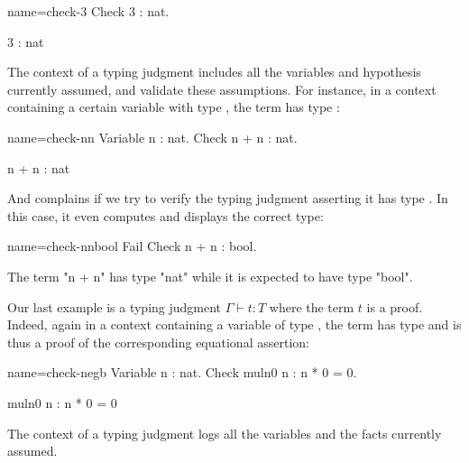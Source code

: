\begin{coq-left}{name=check-3}{}
Check 3 : nat.
\end{coq-left}
\begin{coqout-right}
3 : nat
\end{coqout-right}

The context of a typing judgment includes all the variables and
hypothesis currently assumed, and validate these assumptions.
For instance, in a context containing a certain variable  with
type , the term  has type :

\begin{coq-left}{name=check-nn}{}
Variable n : nat.
Check n + n : nat.
\end{coq-left}
\begin{coqout-right}
n + n : nat
\end{coqout-right}

And \Coq{} complains if we try to verify the typing judgment asserting it
has type . In this case, it even computes and displays the
correct type:

\begin{coq-left}{name=check-nnbool}{}
Fail Check n + n : bool.

\end{coq-left}
\begin{coqout-right}
The term "n + n" has type "nat" while it is expected to have type "bool".
\end{coqout-right}

Our last example is a typing judgment  $\Gamma \vdash t : T$ where
the term $t$ is a proof. Indeed, again in a context containing a
variable  of type , the term
 has type  and is thus a proof of the
corresponding equational assertion:

\begin{coq-left}{name=check-negb}{}
Variable n : nat.
Check muln0 n : n * 0 = 0.

\end{coq-left}
\begin{coqout-right}
muln0 n : n * 0 = 0
\end{coqout-right}

The context of a typing judgment logs all the variables and the facts
currently assumed.


